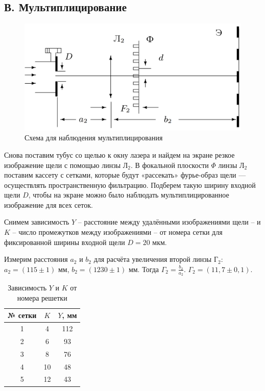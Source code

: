 \documentclass[a4paper,12pt]{article} %
\begin{document}
	\newpage
	\subsection*{В. Мультиплицирование}
	\begin{figure}[h!]
		\centering
		\includegraphics[scale=0.5]{Pictures/Мультиплицирование}
		\caption{Схема для наблюдения мультиплицирования}
	\end{figure}

	Снова поставим тубус со щелью к окну лазера и найдем на экране резкое изображение щели с помощью линзы Л$_2$. В фокальной плоскости $\Phi$ линзы Л$_2$ поставим кассету с сетками, которые будут «рассекать» фурье-образ щели — осуществлять пространственную фильтрацию. Подберем такую ширину входной щели $D$, чтобы на экране можно было наблюдать мультиплицированное изображение для всех сеток.
	
	Снимем зависимость $Y$ -- расстояние между удалёнными изображениями щели -- и $K$ -- число промежутков между изображениями -- от номера сетки для фиксированной ширины входной щели $D = 20$ мкм.
	
	Измерим расстояния $a_2$ и $b_2$ для расчёта увеличения второй линзы Г$_2$: $a_2 = (115 \pm 1)$ мм, $b_2 = (1230 \pm 1)$ мм. Тогда $\Gamma_2 = \frac{b_2}{a_2}$. $\Gamma_2 = (11,7 \pm 0,1)$.
	
	\begin{table}[h!]
		\centering
		\begin{tabular}{|c|c|c|}
			\hline
			№ сетки & $K$ & $Y$, мм \\ \hline
			1       & 4   & 112     \\ \hline
			2       & 6   & 93      \\ \hline
			3       & 8   & 76      \\ \hline
			4       & 10  & 48      \\ \hline
			5       & 12  & 43      \\ \hline
		\end{tabular}
	\caption{Зависимость $Y$ и $K$ от номера решетки}
	\end{table}
	
\end{document}
